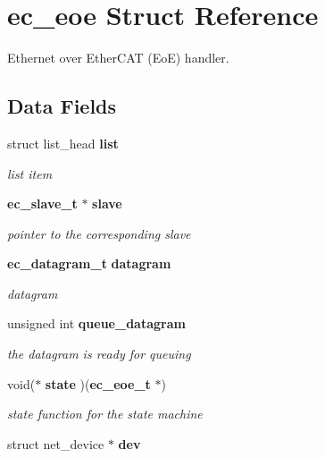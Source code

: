\section{ec\-\_\-eoe \-Struct \-Reference}
\label{structec__eoe}


\-Ethernet over \-Ether\-C\-A\-T (\-Eo\-E) handler.  


\subsection*{\-Data \-Fields}
\begin{DoxyCompactItemize}
\item 
struct list\-\_\-head {\bf list}\label{structec__eoe_af41c63118154c1645769f19658256df0}

\begin{DoxyCompactList}\small\item\em list item \end{DoxyCompactList}\item 
{\bf ec\-\_\-slave\-\_\-t} $\ast$ {\bf slave}\label{structec__eoe_a4a07acce0d52dfec65250bb9e8152976}

\begin{DoxyCompactList}\small\item\em pointer to the corresponding slave \end{DoxyCompactList}\item 
{\bf ec\-\_\-datagram\-\_\-t} {\bf datagram}\label{structec__eoe_a58a38a4520677a172eb12ed44d230502}

\begin{DoxyCompactList}\small\item\em datagram \end{DoxyCompactList}\item 
unsigned int {\bf queue\-\_\-datagram}\label{structec__eoe_a3a3a486cb3359c0d528e4e4e37a6953d}

\begin{DoxyCompactList}\small\item\em the datagram is ready for queuing \end{DoxyCompactList}\item 
void($\ast$ {\bf state} )({\bf ec\-\_\-eoe\-\_\-t} $\ast$)\label{structec__eoe_a13b721b4041a46522ddce127720095d1}

\begin{DoxyCompactList}\small\item\em state function for the state machine \end{DoxyCompactList}\item 
struct net\-\_\-device $\ast$ {\bf dev}\label{structec__eoe_aa11f7b383aa09219aca3cfeffcdb55df}


\end{DoxyCompactItemize}

